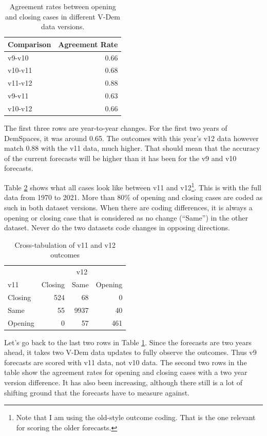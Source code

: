 \documentclass[
  11pt,
]{article}
\begin{document}
\begin{table}

\caption{\label{tab:agreement}Agreement rates between opening and closing cases in different V-Dem data versions.}
\centering
\begin{tabular}[t]{lr}
\toprule
Comparison & Agreement Rate\\
\midrule
v9-v10 & 0.66\\
v10-v11 & 0.68\\
v11-v12 & 0.88\\
\addlinespace
v9-v11 & 0.63\\
v10-v12 & 0.66\\
\bottomrule
\end{tabular}
\end{table}

The first three rows are year-to-year changes. For the first two years
of DemSpaces, it was around 0.65. The outcomes with this year's v12 data
however match 0.88 with the v11 data, much higher. That should mean that
the accuracy of the current forecasts will be higher than it has been
for the v9 and v10 forecasts.

Table \ref{tab:v11-v12} shows what all cases look like between v11 and
v12\footnote{Note that I am using the old-style outcome coding. That is
  the one relevant for scoring the older forecasts.}. This is with the
full data from 1970 to 2021. More than 80\% of opening and closing cases
are coded as such in both dataset versions. When there are coding
differences, it is always a opening or closing case that is considered
as no change (``Same'') in the other dataset. Never do the two datasets
code changes in opposing directions.

\begin{table}

\caption{\label{tab:v11-v12}Cross-tabulation of v11 and v12 outcomes}
\centering
\begin{tabular}[t]{lrrr}
\toprule
\multicolumn{1}{c}{} & \multicolumn{3}{c}{v12} \\
\cmidrule(l{3pt}r{3pt}){2-4}
v11 & Closing & Same & Opening\\
\midrule
Closing & 524 & 68 & 0\\
Same & 55 & 9937 & 40\\
Opening & 0 & 57 & 461\\
\bottomrule
\end{tabular}
\end{table}

Let's go back to the last two rows in Table \ref{tab:agreement}. Since
the forecasts are two years ahead, it takes two V-Dem data updates to
fully observe the outcomes. Thus v9 forecasts are scored with v11 data,
not v10 data. The second two rows in the table show the agreement rates
for opening and closing cases with a two year version difference. It has
also been increasing, although there still is a lot of shifting ground
that the forecasts have to measure against.
\end{document}

